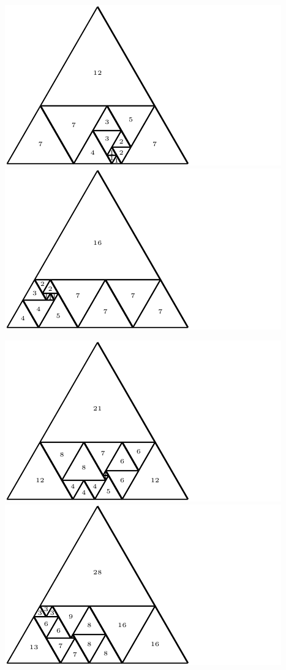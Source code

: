 \documentclass[12pt,amstags,fleqn]{article}
\theoremstyle{plain}
\theoremstyle{definition}
\theoremstyle{definition}
\begin{document}
\begin{center}
\includegraphics{max_relative_size_13.pdf}\includegraphics{max_relative_size_14.pdf}
\end{center}
\begin{center}
\includegraphics{max_relative_size_15.pdf}\includegraphics{max_relative_size_16.pdf}
\end{center}
\end{document}
